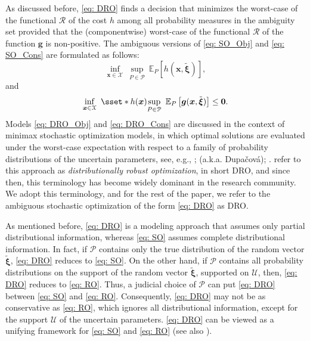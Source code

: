 \documentclass[final,onefignum,onetabnum]{class}
\newcommand{\ee}[2]{\mathbb{E}_{#1} \left[ #2 \right]}
\newcommand{\bs}[1]{\boldsymbol{#1}} %
\newcommand{\Cs}[1]{\mathcal{#1}} %
\newcommand{\txi}{\tilde{\bs{\xi}}}
\newcommand{\dro}{DRO}
\begin{document}
As discussed before, \eqref{eq: DRO} finds a decision that minimizes the worst-case of the functional  $\Cs{R}$ of the cost  $h$ among all probability measures in the ambiguity set provided that the (componentwise) worst-case of the functional $\Cs{R}$ of the function $\bs{g}$ is non-positive.
The  ambiguous versions of  \eqref{eq: SO_Obj} and \eqref{eq: SO_Cons} are  formulated as follows:
\begin{equation}
\label{eq: DRO_Obj}
\inf_{\bs{x} \in \Cs{X} } \ \sup_{P \in \Cs{P}} \ 	\ee{P}{h(\bs{x},\txi)},
\end{equation}
and
\begin{equation}
\label{eq: DRO_Cons}
\inf_{\bs{x} \in \Cs{X} } \ 	\sset*{h(\bs{x})}{\sup_{P \in \Cs{P} } \ \ee{P }{\bs{g}(\bs{x},\txi)} \le \bs{0}}.
\end{equation}
Models \eqref{eq: DRO_Obj} and \eqref{eq: DRO_Cons}  are  discussed in the
context of minimax stochastic optimization models, in which optimal solutions are evaluated under the worst-case expectation with respect  to a family of probability distributions of the uncertain
parameters, see, e.g.,  \citet{scarf1958}; \citet{zackova1966} (a.k.a. Dupa{\v{c}}ov{\'a}); \citet{dupacova1987,breton1995,shapiro2002minimax,shapiro2004minmax}. \citet{delage2010} refer to this approach as {\it distributionally robust optimization}, in short \dro, and since then, this terminology has become widely dominant in the  research community. We adopt this terminology, and for the rest of the paper, we refer to the ambiguous stochastic optimization of the form  \eqref{eq: DRO} as \dro. 

As mentioned before, \eqref{eq: DRO} is a modeling approach that assumes only partial distributional information, whereas \eqref{eq: SO} assumes complete distributional information. In fact, if $\Cs{P}$ contains only the  true distribution of the random vector $\txi$, \eqref{eq: DRO} reduces to \eqref{eq: SO}. On the other hand, if $\Cs{P}$ contains all probability distributions on the support of the random vector $\txi$, supported on $\Cs{U}$, then, \eqref{eq: DRO} reduces to \eqref{eq: RO}. Thus, a judicial choice of  $\Cs{P}$ can put \eqref{eq: DRO} between \eqref{eq: SO} and \eqref{eq: RO}. Consequently, \eqref{eq: DRO} may not be as conservative as \eqref{eq: RO}, which ignores all distributional information, except for the support $\Cs{U}$ of the uncertain parameters. 
\eqref{eq: DRO} can be viewed as a unifying framework for \eqref{eq: SO} and \eqref{eq: RO} (see also \citet{qian2018}). 
\end{document}
